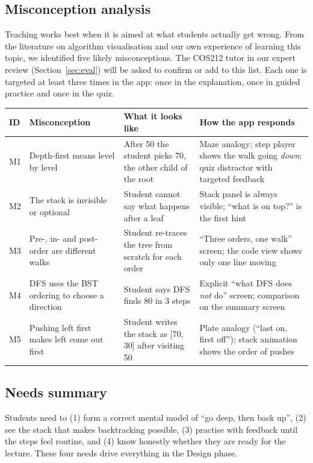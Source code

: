 \documentclass[11pt,a4paper]{article}
\begin{document}
\subsection{Misconception analysis}

Teaching works best when it is aimed at what students actually get wrong. From the literature on
algorithm visualisation and our own experience of learning this topic, we identified five likely
misconceptions. The COS212 tutor in our expert review (Section~\ref{sec:eval}) will be asked to
confirm or add to this list. Each one is targeted
at least three times in the app: once in the explanation, once in guided practice and once in the
quiz.

\begin{longtable}{@{}p{0.6cm} p{4.6cm} p{4.6cm} p{4.8cm}@{}}
  \toprule
  \textbf{ID} & \textbf{Misconception} & \textbf{What it looks like} & \textbf{How the app responds} \\
  \midrule
  \endhead
  M1 & Depth-first means level by level & After 50 the student picks 70, the other child of the
       root & Maze analogy; step player shows the walk going \emph{down}; quiz distractor with
       targeted feedback \\
  M2 & The stack is invisible or optional & Student cannot say what happens after a leaf &
       Stack panel is always visible; ``what is on top?'' is the first hint \\
  M3 & Pre-, in- and post-order are different walks & Student re-traces the tree from scratch for
       each order & ``Three orders, one walk'' screen; the code view shows only one line moving \\
  M4 & DFS uses the BST ordering to choose a direction & Student says DFS finds 80 in 3 steps &
       Explicit ``what DFS does \emph{not} do'' screen; comparison on the summary screen \\
  M5 & Pushing left first makes left come out first & Student writes the stack as [70, 30] after
       visiting 50 & Plate analogy (``last on, first off''); stack animation shows the order of pushes \\
  \bottomrule
\end{longtable}

\subsection{Needs summary}

Students need to (1) form a correct mental model of ``go deep, then back up'', (2) see the stack
that makes backtracking possible, (3) practise with feedback until the steps feel routine, and
(4) know honestly whether they are ready for the lecture. These four needs drive everything in
the Design phase.
\end{document}
